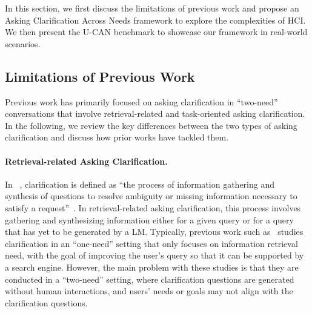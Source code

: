 \documentclass{article} %
\theoremstyle{definition}
\begin{document}
\label{sec:setting}
\setlength{\belowcaptionskip}{-0.2cm}

In this section, we first discuss the limitations of previous work and propose an Asking Clarification Across Needs framework to explore the complexities of HCI. We then present the U-CAN benchmark to showcase our framework in real-world scenarios.

\subsection{Limitations of Previous Work}
\label{subsec:clarification_literature}

Previous work has primarily focused on asking clarification in ``two-need'' conversations that involve retrieval-related and task-oriented asking clarification. In the following, we review the key differences between the two types of asking clarification and discuss how prior works have tackled them.
\paragraph{Retrieval-related Asking Clarification.}
In ~\citet{clarify_survey,proactive_survey}, clarification is defined as ``the process of information gathering and synthesis of questions to resolve ambiguity or missing information necessary to satisfy a request''~\citep{clarify_survey}.
In retrieval-related asking clarification, this process involves gathering and synthesizing information either for a given query or for a query that has yet to be generated by a LM.
Typically, previous work such as~\citet{clarinet} studies clarification in an ``one-need'' setting that only focuses on information retrieval need, with the goal of improving the user's query so that it can be supported by a search engine.
However, the main problem with these studies is that they are conducted in a ``two-need'' setting, where clarification questions are generated without human interactions, and users' needs or goals may not align with the clarification questions.
\end{document}
